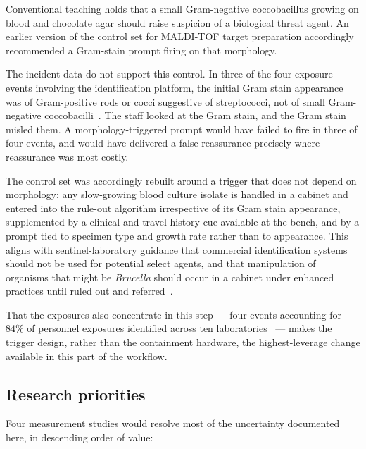Conventional teaching holds that a small Gram-negative coccobacillus growing on blood and
chocolate agar should raise suspicion of a biological threat agent. An earlier version of
the control set for MALDI-TOF target preparation accordingly recommended a Gram-stain
prompt firing on that morphology.

The incident data do not support this control. In three of the four exposure events
involving the identification platform, the initial Gram stain appearance was of
Gram-positive rods or cocci suggestive of streptococci, not of small Gram-negative
coccobacilli~\cite{ackelsberg2020}. The staff looked at the Gram stain, and the Gram stain
misled them. A morphology-triggered prompt would have failed to fire in three of four
events, and would have delivered a false reassurance precisely where reassurance was most
costly.

The control set was accordingly rebuilt around a trigger that does not depend on
morphology: any slow-growing blood culture isolate is handled in a cabinet and entered
into the rule-out algorithm irrespective of its Gram stain appearance, supplemented by a
clinical and travel history cue available at the bench, and by a prompt tied to specimen
type and growth rate rather than to appearance. This aligns with sentinel-laboratory
guidance that commercial identification systems should not be used for potential select
agents, and that manipulation of organisms that might be \emph{Brucella} should occur in a
cabinet under enhanced practices until ruled out and referred~\cite{asmbruc2025}.

That the exposures also concentrate in this step --- four events accounting for 84\% of
personnel exposures identified across ten
laboratories~\cite{ackelsberg2020} --- makes the trigger design, rather than the
containment hardware, the highest-leverage change available in this part of the workflow.

\subsection{Research priorities}

Four measurement studies would resolve most of the uncertainty documented here, in
descending order of value:

